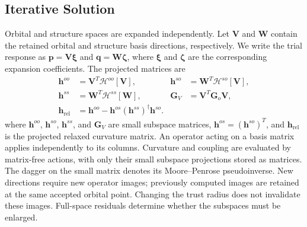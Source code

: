 \documentclass[12pt]{article}
\begin{document}
\subsection{Iterative Solution}

Orbital and structure spaces are expanded independently. Let \(\mathbf V\) and \(\mathbf W\) contain the retained orbital and structure basis directions, respectively. We write the trial response as \(\mathbf p=\mathbf V\boldsymbol\xi\) and \(\mathbf q=\mathbf W\boldsymbol\zeta\), where \(\boldsymbol\xi\) and \(\boldsymbol\zeta\) are the corresponding expansion coefficients. The projected matrices are
\begin{equation}
 \begin{aligned}
 \mathbf h^{oo}&=\mathbf V^T\mathcal H^{oo}[\mathbf V],&
 \mathbf h^{so}&=\mathbf W^T\mathcal H^{so}[\mathbf V],\\
 \mathbf h^{ss}&=\mathbf W^T\mathcal H^{ss}[\mathbf W],&
 \mathbf G_V&=\mathbf V^T\mathbf G_o\mathbf V,\\
 \mathbf h_{\mathrm{rel}}&=\mathbf h^{oo}-\mathbf h^{os}(\mathbf h^{ss})^\dagger\mathbf h^{so}.&&
 \end{aligned}
 \label{eq:projection}
\end{equation}
where \(\mathbf h^{oo}\), \(\mathbf h^{so}\), \(\mathbf h^{ss}\), and \(\mathbf G_V\) are small subspace matrices, \(\mathbf h^{os}=(\mathbf h^{so})^T\), and \(\mathbf h_{\mathrm{rel}}\) is the projected relaxed curvature matrix. An operator acting on a basis matrix applies independently to its columns. Curvature and coupling are evaluated by matrix-free actions, with only their small subspace projections stored as matrices. The dagger on the small matrix denotes its Moore--Penrose pseudoinverse. New directions require new operator images; previously computed images are retained at the same accepted orbital point. Changing the trust radius does not invalidate these images. Full-space residuals determine whether the subspaces must be enlarged.
\end{document}
